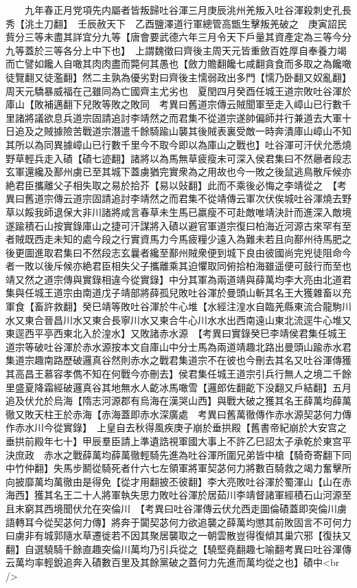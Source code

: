 　　九年春正月党項先内屬者皆叛歸吐谷渾三月庚辰洮州羌叛入吐谷渾殺刺史孔長秀【洮土刀翻】　壬辰赦天下　乙酉鹽澤道行軍總管高甑生擊叛羌破之　庚寅詔民貲分三等未盡其詳宜分九等【唐會要武德六年三月令天下戶量其資產定為三等今分九等蓋於三等各分上中下也】　上謂魏徵曰齊後主周天元皆重斂百姓厚自奉養力竭而亡譬如饞人自噉其肉肉盡而斃何其愚也【斂力贍翻饞七咸翻貪食而多取之為饞噉徒覽翻又徒濫翻】然二主孰為優劣對曰齊後主懦弱政出多門【懦乃卧翻又奴亂翻】周天元驕暴威福在己雖同為亡國齊主尤劣也　夏閏四月癸酉任城王道宗敗吐谷渾於庫山【敗補邁翻下兒敗等敗之敗同　考異曰舊道宗傳云賊聞軍至走入嶂山已行數千里諸將議欲息兵道宗固請追討李靖然之而君集不從道宗遂帥偏師并行兼道去大軍十日追及之賊據險苦戰道宗潛遣千餘騎踰山襲其後賊表裏受敵一時奔潰庫山嶂山不知其所以為同異據嶂山已行數千里今不取今即以為庫山之戰也】吐谷渾可汗伏允悉燒野草輕兵走入磧【磧七迹翻】諸將以為馬無草疲瘦未可深入侯君集曰不然曏者段志玄軍還纔及鄯州虜已至其城下蓋虜猶完實衆為之用故也今一敗之後鼠逃鳥散斥候亦絶君臣攜離父子相失取之易於拾芥【易以䜴翻】此而不乘後必悔之李靖從之　【考異曰舊道宗傳云道宗固請追討李靖然之而君集不從靖傳云軍次伏俟城吐谷渾燒去野草以餒我師退保大非川諸將咸言春草未生馬已羸瘦不可赴敵唯靖決計而進深入敵境遂踰積石山按實錄庫山之捷可汗謀將入磧以避官軍道宗復曰柏海近河源古來罕有至者賊既西走未知的處今段之行實資馬力今馬疲糧少遠入為難未若且向鄯州待馬肥之後更圖進取君集曰不然段志玄曩者纔至鄯州賊衆便到城下良由彼國尚完兇徒阻命今者一敗以後斥候亦絶君臣相失父子攜離乘其迫懼取同俯拾柏海雖遥便可鼓行而至也靖又然之道宗傳與實錄相違今從實錄】中分其軍為兩道靖與薛萬均李大亮由北道君集與任城王道宗由南道戊子靖部將薛孤兒敗吐谷渾於曼頭山斬其名王大獲雜畜以充軍食【畜許救翻】癸巳靖等敗吐谷渾於牛心堆【水經注湟水自臨羌縣東流合龍駒川水又東合晉昌川水又東合長寧川水又東合牛心川水水出西南遠山東北流逕牛心堆又東逕西平亭西東北入於湟水】又敗諸赤水源　【考異曰實錄癸巳李靖侯君集任城王道宗等破吐谷渾於赤水源按本文自庫山中分士馬為兩道靖趣北路出曼頭山踰赤水君集道宗趣南路歷破邏真谷然則赤水之戰君集道宗不在彼也今刪去其名又吐谷渾傳獲其高昌王慕容孝儁不知在何戰今亦刪去】侯君集任城王道宗引兵行無人之境二千餘里盛夏降霜經破邏真谷其地無水人齕冰馬噉雪【邏郎佐翻齕下没翻又戶結翻】五月追及伏允於烏海【隋志河源郡有烏海在漢哭山西】與戰大破之獲其名王薛萬均薛萬徹又敗天柱王於赤海【赤海蓋即赤水深廣處　考異曰舊萬徹傳作赤水源契苾何力傳作赤水川今從實錄】　上皇自去秋得風疾庚子崩於垂拱殿【舊書帝紀崩於大安宫之垂拱前殿年七十】甲辰羣臣請上準遺誥視軍國大事上不許乙巳詔太子承乾於東宫平決庶政　赤水之戰薛萬均薛萬徹輕騎先進為吐谷渾所圍兄弟皆中槍【騎奇寄翻下同中竹仲翻】失馬步鬭從騎死者什六七左領軍將軍契苾何力將數百騎救之竭力奮擊所向披靡萬均萬徹由是得免【從才用翻披丕彼翻】李大亮敗吐谷渾於蜀渾山【山在赤海西】獲其名王二十人將軍執失思力敗吐谷渾於居茹川李靖督諸軍經積石山河源至且末窮其西境聞伏允在突倫川　【考異曰吐谷渾傳云伏允西走圖倫磧蓋即突倫川虜語轉耳今從契苾何力傳】將奔于闐契苾何力欲追襲之薛萬均懲其前敗固言不可何力曰虜非有城郭隨水草遷徙若不因其聚居襲取之一朝雲散豈得復傾其巢穴邪【復扶又翻】自選驍騎千餘直趣突倫川萬均乃引兵從之【驍堅堯翻趣七喻翻考異曰吐谷渾傳云萬均率輕銳追奔入磧數百里及其餘黨破之蓋何力先進而萬均從之也】磧中<br />
